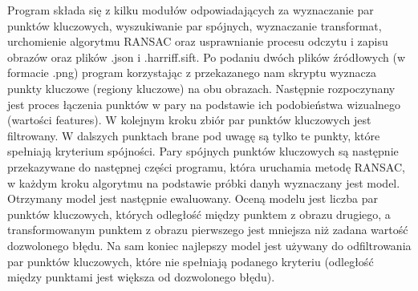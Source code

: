 \documentclass[../main.tex]{subfiles}
\begin{document}
    Program składa się z kilku modułów odpowiadających za wyznaczanie par punktów kluczowych, wyszukiwanie par spójnych, wyznaczanie transformat, urchomienie algorytmu RANSAC oraz usprawnianie procesu odczytu i zapisu obrazów oraz plików .json i .harriff.sift. Po podaniu dwóch plików źródłowych (w formacie .png) program korzystając z przekazanego nam skryptu wyznacza punkty kluczowe (regiony kluczowe) na obu obrazach. Następnie rozpoczynany jest proces łączenia punktów w pary na podstawie ich podobieństwa wizualnego (wartości features). W kolejnym kroku zbiór par punktów kluczowych jest filtrowany. W dalszych punktach brane pod uwagę są tylko te punkty, które spełniają kryterium spójności. Pary spójnych punktów kluczowych są następnie przekazywane do następnej części programu, która uruchamia metodę RANSAC, w każdym kroku algorytmu na podstawie próbki danyh wyznaczany jest model. Otrzymany model jest następnie ewaluowany. Oceną modelu jest liczba par punktów kluczowych, których odległość między punktem z obrazu drugiego, a transformowanym punktem z obrazu pierwszego jest mniejsza niż zadana wartość dozwolonego błędu. Na sam koniec najlepszy model jest używany do odfiltrowania par punktów kluczowych, które nie spełniają podanego kryteriu (odległość między punktami jest większa od dozwolonego błędu).
\end{document}
